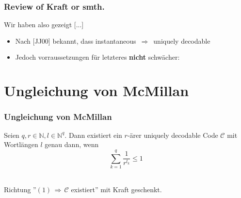 \documentclass{beamer}
\begin{document}
\begin{frame}
    \frametitle{Review of Kraft or smth.}

    Wir haben also gezeigt [...]

    \begin{itemize}
        \item Nach [JJ00] bekannt, dass instantaneous $\,\Longrightarrow\,$ uniquely decodable
        \item Jedoch vorraussetzungen für letzteres \textbf{nicht} schwächer:
    \end{itemize}

\end{frame}

\section{Ungleichung von McMillan}

\begin{frame}
    \frametitle{Ungleichung von McMillan}
    Seien $q,r \in \mathbb{N}, l \in \mathbb{N}^q$. Dann existiert ein $r$-ärer uniquely decodable Code $\mathcal{C}$
    mit Wortlängen $l$ genau dann, wenn
    \begin{equation}
        \sum_{k=1}^{q} \frac{1}{r^{l_k}} \leq 1
    \end{equation}\\[20pt]
    \pause

    Richtung ''$(1) \,\Longrightarrow\, \mathcal{C}$ existiert'' mit Kraft geschenkt.\\
\end{frame}
\end{document}
